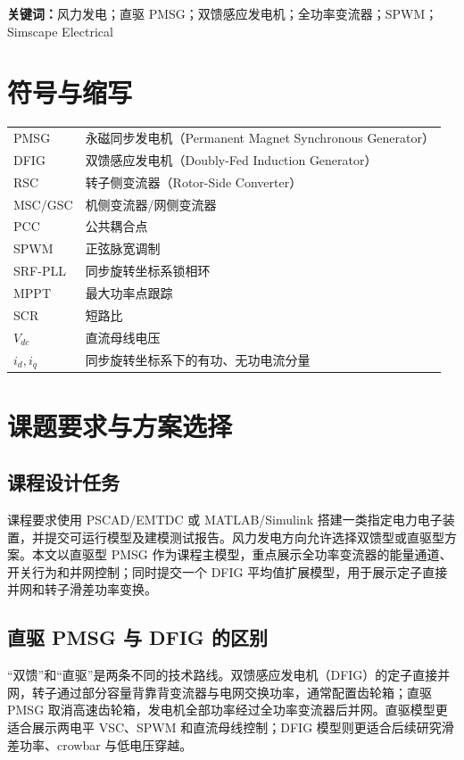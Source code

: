 \documentclass[UTF8,zihao=-4,fontset=none]{ctexrep}
\begin{document}
\noindent\textbf{关键词：}风力发电；直驱 PMSG；双馈感应发电机；全功率变流器；SPWM；Simscape Electrical

\chapter*{符号与缩写}
\begin{longtable}{p{2.8cm}p{10.2cm}}
\toprule
PMSG & 永磁同步发电机（Permanent Magnet Synchronous Generator）\\
DFIG & 双馈感应发电机（Doubly-Fed Induction Generator）\\
RSC & 转子侧变流器（Rotor-Side Converter）\\
MSC/GSC & 机侧变流器/网侧变流器\\
PCC & 公共耦合点\\
SPWM & 正弦脉宽调制\\
SRF-PLL & 同步旋转坐标系锁相环\\
MPPT & 最大功率点跟踪\\
SCR & 短路比\\
\(V_{dc}\) & 直流母线电压\\
\(i_d,i_q\) & 同步旋转坐标系下的有功、无功电流分量\\
\bottomrule
\end{longtable}

\tableofcontents

\clearpage
{}
\chapter{课题要求与方案选择}
\section{课程设计任务}
课程要求使用 PSCAD/EMTDC 或 MATLAB/Simulink 搭建一类指定电力电子装置，并提交可运行模型及建模测试报告。风力发电方向允许选择双馈型或直驱型方案。本文以直驱型 PMSG 作为课程主模型，重点展示全功率变流器的能量通道、开关行为和并网控制；同时提交一个 DFIG 平均值扩展模型，用于展示定子直接并网和转子滑差功率变换。

\section{直驱 PMSG 与 DFIG 的区别}
“双馈”和“直驱”是两条不同的技术路线。双馈感应发电机（DFIG）的定子直接并网，转子通过部分容量背靠背变流器与电网交换功率，通常配置齿轮箱；直驱 PMSG 取消高速齿轮箱，发电机全部功率经过全功率变流器后并网。直驱模型更适合展示两电平 VSC、SPWM 和直流母线控制；DFIG 模型则更适合后续研究滑差功率、crowbar 与低电压穿越。
\end{document}
